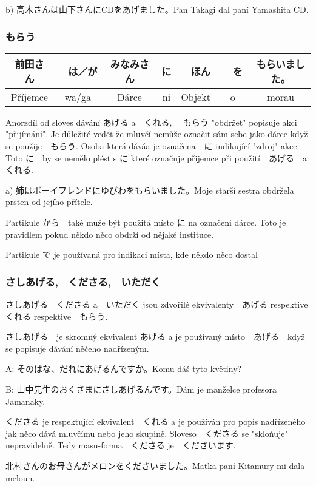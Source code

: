 b) 高木さんは山下さんにCDをあげました。Pan Takagi dal paní Yamashita CD.



\subsubsection{もらう}

\begin{tabular}{||c|c||c|c||c|c||c||}
\hline
前田さん&　は／が　&みなみさん　&に&　ほん&　を　&もらいました。\\
\hline
Příjemce&wa/ga&Dárce&ni&Objekt&o&morau\\
\hline
\end{tabular}


Anorzdíl od sloves dávání あげる a　くれる, 　もらう "obdržet" popisuje akci "přijímání". Je důležité vedět že mluvčí nemůže označit sám sebe jako dárce když se použije　もらう. Osoba která dáváa je označena　に indikující "zdroj" akce.　Toto に　by se nemělo plést s に které označuje přijemce při použití　あげる　a くれる.


a) 姉はボーイフレンドにゆびわをもらいました。Moje starší sestra obdržela prsten od jejího přítele.

Partikule から　také může být použitá místo に na označeni dárce. Toto je pravidlem pokud někdo něco obdrží od nějaké instituce.

Partikule で je používaná pro indikaci místa, kde někdo něco dostal

\subsubsection{さしあげる,　くださる,　いただく}

さしあげる　くださる a　いただく jsou zdvořilé ekvivalenty　あげる respektive　くれる respektive　もらう. 

さしあげる　je skromný ekvivalent あげる a je používaný místo　あげる　když se popisuje dávání něčeho nadřízeným.

A: そのはな、だれにあげるんですか。Komu dáš tyto květiny?

B: 山中先生のおくさまにさしあげるんです。Dám je manželce profesora Jamanaky.

くださる je respektující ekvivalent　くれる a je používán pro popis nadřízeného jak něco dává mluvčímu nebo jeho skupině. Sloveso　くださる se "skloňuje" nepravidelně. Tedy masu-forma　くださる je　くださいます.

北村さんのお母さんがメロンをくださいました。Matka paní Kitamury mi dala meloun.

